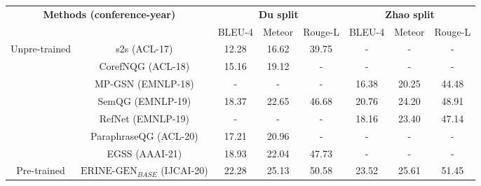 \documentclass[11pt]{article}
\begin{document}
\begin{table*}[t]
\centering
\small
\begin{tabular}{@{}c|c|ccc|ccc@{}}
\toprule[1pt]
\multicolumn{2}{c|}{\multirow{2}{*}{\textbf{Methods (conference-year)}}} & \multicolumn{3}{c|}{\textbf{Du split}}    & \multicolumn{3}{c}{\textbf{Zhao split}}                            \\
\multicolumn{2}{c|}{}                     & BLEU-4         & Meteor         & Rouge-L & BLEU-4               & Meteor               & Rouge-L              \\ \midrule
\multirow{7}{*}{Unpre-trained}           & s2s (ACL-17)                    & 12.28          & 16.62          & 39.75       & -                    & -                    & -                    \\  
& CorefNQG (ACL-18)                    & 15.16          & 19.12          & -       & -                    & -                    & -                    \\
 & MP-GSN (EMNLP-18)                      & -              & -              & -       & 16.38                & 20.25                & 44.48     
 \\


                                          & SemQG (EMNLP-19)                       & 18.37          & 22.65          & 46.68   & 20.76                & 24.20                & 48.91                \\
                                          & RefNet (EMNLP-19)                      & -              & -              & -       & 18.16                & 23.40                & 47.14                \\
 & ParaphraseQG (ACL-20)                      & 17.21              & 20.96              & -       & -                & -                & -                \\
                                         
                                          & EGSS (AAAI-21)                        & 18.93          & 22.04          & 47.73   & -                    & -                    & -     
                                          \\ \midrule
\multirow{5}{*}{Pre-trained}               


 & $\text{ERINE-GEN}_{\textit{BASE}}$ (IJCAI-20)            & 22.28          & 25.13          & 50.58   & 23.52                & 25.61                & 51.45                \\


\end{tabular}
\end{table*}
\end{document}
